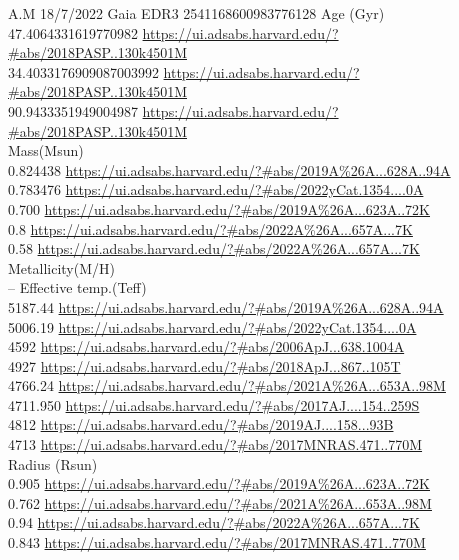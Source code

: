 A.M 18/7/2022
Gaia EDR3 2541168600983776128
Age (Gyr)\\
47.4064331619770982	 \url{https://ui.adsabs.harvard.edu/?#abs/2018PASP..130k4501M}\\	
34.4033176909087003992	\url{https://ui.adsabs.harvard.edu/?#abs/2018PASP..130k4501M}\\
90.9433351949004987	\url{https://ui.adsabs.harvard.edu/?#abs/2018PASP..130k4501M}\\
Mass(Msun)\\
0.824438 \url{https://ui.adsabs.harvard.edu/?#abs/2019A%26A...628A..94A}\\
0.783476 \url{https://ui.adsabs.harvard.edu/?#abs/2022yCat.1354....0A}\\
0.700 \url{https://ui.adsabs.harvard.edu/?#abs/2019A%26A...623A..72K}\\
0.8 \url{https://ui.adsabs.harvard.edu/?#abs/2022A%26A...657A...7K}\\
0.58 \url{https://ui.adsabs.harvard.edu/?#abs/2022A%26A...657A...7K}\\
Metallicity(M/H)\\
--
Effective temp.(Teff)\\
5187.44	\url{https://ui.adsabs.harvard.edu/?#abs/2019A%26A...628A..94A}\\
5006.19 \url{https://ui.adsabs.harvard.edu/?#abs/2022yCat.1354....0A}\\
4592 \url{https://ui.adsabs.harvard.edu/?#abs/2006ApJ...638.1004A}\\
4927 \url{https://ui.adsabs.harvard.edu/?#abs/2018ApJ...867..105T}\\
4766.24 \url{https://ui.adsabs.harvard.edu/?#abs/2021A%26A...653A..98M}\\
4711.950 \url{https://ui.adsabs.harvard.edu/?#abs/2017AJ....154..259S}\\
4812 \url{https://ui.adsabs.harvard.edu/?#abs/2019AJ....158...93B}\\
4713 \url{https://ui.adsabs.harvard.edu/?#abs/2017MNRAS.471..770M}\\
Radius (Rsun)\\
0.905 \url{https://ui.adsabs.harvard.edu/?#abs/2019A%26A...623A..72K}\\
0.762 \url{https://ui.adsabs.harvard.edu/?#abs/2021A%26A...653A..98M}\\
0.94 \url{https://ui.adsabs.harvard.edu/?#abs/2022A%26A...657A...7K}\\
0.843	\url{https://ui.adsabs.harvard.edu/?#abs/2017MNRAS.471..770M}\\
